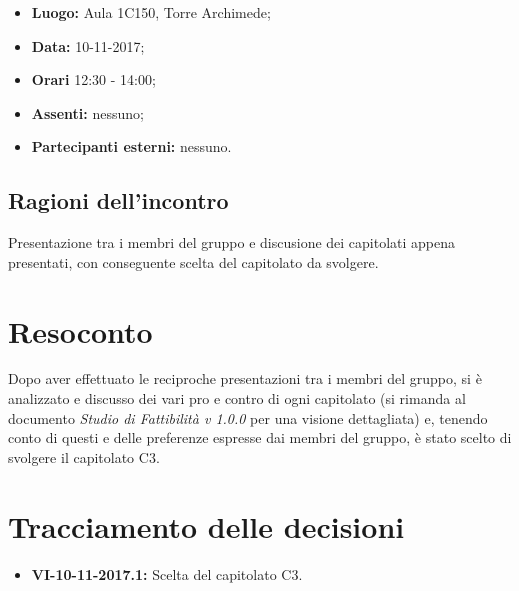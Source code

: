 \documentclass[openany,12pt,a4paper]{article}
\begin{document}
	\begin{itemize} 
	    \item \textbf{Luogo:} Aula 1C150, Torre Archimede;
	    \item \textbf{Data:} 10-11-2017;
	    \item \textbf{Orari} 12:30 - 14:00;
	    \item \textbf{Assenti:} nessuno;
	    \item \textbf{Partecipanti esterni:} nessuno.
	\end{itemize}
	
	\subsection{Ragioni dell'incontro}
	
	Presentazione tra i membri del gruppo e discusione dei capitolati appena presentati, con conseguente scelta del capitolato da svolgere.
	
	\section{Resoconto}
	
	Dopo aver effettuato le reciproche presentazioni tra i membri del gruppo, si è analizzato e discusso dei vari pro e contro di ogni capitolato (si rimanda al documento \textit{Studio di Fattibilità v 1.0.0} per una visione dettagliata) e, tenendo conto di questi e delle preferenze espresse dai membri del gruppo, è stato scelto di svolgere il capitolato C3.
	
	\section{Tracciamento delle decisioni}
	
	\begin{itemize}
	    \item \textbf{VI-10-11-2017.1:} Scelta del capitolato C3.
	\end{itemize}
	
	
\end{document}
